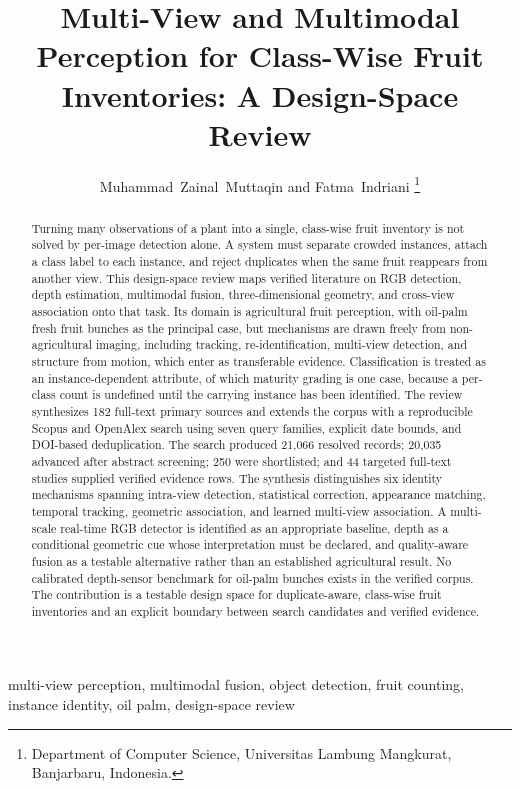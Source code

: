 \documentclass[journal]{IEEEtran}
\begin{document}
\title{Multi-View and Multimodal Perception for Class-Wise Fruit Inventories: A Design-Space Review}
\author{Muhammad~Zainal~Muttaqin and Fatma~Indriani%
\thanks{Department of Computer Science, Universitas Lambung Mangkurat, Banjarbaru, Indonesia.}}
\maketitle
\begin{abstract}
Turning many observations of a plant into a single, class-wise fruit inventory
is not solved by per-image detection alone. A system must separate crowded
instances, attach a class label to each instance, and reject duplicates when the
same fruit reappears from another view. This design-space review maps verified
literature on RGB detection, depth estimation, multimodal fusion,
three-dimensional geometry, and cross-view association onto that task. Its domain
is agricultural fruit perception, with oil-palm fresh fruit bunches as the
principal case, but mechanisms are drawn freely from non-agricultural imaging,
including tracking, re-identification, multi-view detection, and structure from
motion, which enter as transferable evidence. Classification is treated as an
instance-dependent attribute, of which maturity grading is one case, because a
per-class count is undefined until the carrying instance has been identified.
The review synthesizes 182 full-text primary sources and extends the corpus with
a reproducible Scopus and OpenAlex search using seven query families, explicit
date bounds, and DOI-based deduplication. The search produced 21,066 resolved
records; 20,035 advanced after abstract screening; 250 were shortlisted; and 44
targeted full-text studies supplied verified evidence rows. The synthesis
distinguishes six identity mechanisms spanning intra-view detection, statistical
correction, appearance matching, temporal tracking, geometric association, and
learned multi-view association. A multi-scale real-time RGB detector is
identified as an appropriate baseline, depth as a conditional geometric cue
whose interpretation must be declared, and quality-aware fusion as a testable
alternative rather than an established agricultural result. No calibrated
depth-sensor benchmark for oil-palm bunches exists in the verified corpus. The
contribution is a testable design space for duplicate-aware, class-wise fruit
inventories and an explicit boundary between search candidates and verified
evidence.
\end{abstract}
\begin{IEEEkeywords}
multi-view perception, multimodal fusion, object detection, fruit counting,
instance identity, oil palm, design-space review
\end{IEEEkeywords}



\end{document}
